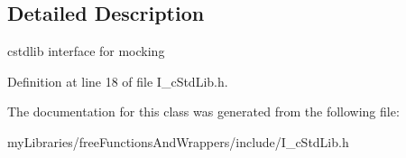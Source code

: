 \subsection{Detailed Description}
cstdlib interface for mocking 

Definition at line 18 of file I\+\_\+c\+Std\+Lib.\+h.



The documentation for this class was generated from the following file\+:\begin{DoxyCompactItemize}
\item 
my\+Libraries/free\+Functions\+And\+Wrappers/include/I\+\_\+c\+Std\+Lib.\+h\end{DoxyCompactItemize}
